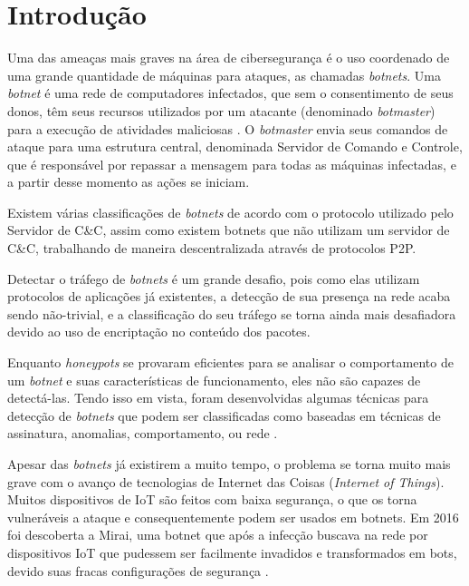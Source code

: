 \chapter{Introdução}
\label{c.introducao}

Uma das ameaças mais graves na área de cibersegurança é o uso coordenado de uma grande quantidade de máquinas para ataques, as chamadas \textit{botnets}. Uma \textit{botnet} é uma rede de computadores infectados, que sem o consentimento de seus donos, têm seus recursos utilizados por um atacante (denominado \textit{botmaster}) para a execução de atividades maliciosas \cite{miller2016role}. O \textit{botmaster} envia seus comandos de ataque para uma estrutura central, denominada Servidor de Comando e Controle, que é responsável por repassar a mensagem para todas as máquinas infectadas, e a partir desse momento as ações se iniciam.

Existem várias classificações de \textit{botnets} de acordo com o protocolo utilizado pelo Servidor de C\&C, assim como existem botnets que não utilizam um servidor de C\&C, trabalhando de maneira descentralizada através de protocolos P2P. 

Detectar o tráfego de \textit{botnets} é um grande desafio, pois como elas utilizam protocolos de aplicações já existentes, a detecção de sua presença na rede acaba sendo não-trivial, e a classificação do seu tráfego se torna ainda mais desafiadora devido ao uso de encriptação no conteúdo dos pacotes. \cite{lu2008botnets}
	
Enquanto \textit{honeypots} se provaram eficientes para se analisar o comportamento de um \textit{botnet} e suas características de funcionamento, eles não são capazes de detectá-las. Tendo isso em vista, foram desenvolvidas algumas técnicas para detecção de \textit{botnets} que podem ser classificadas como baseadas em técnicas de assinatura, anomalias, comportamento, ou rede \cite{asha2016analysis}.

Apesar das \textit{botnets} já existirem a muito tempo, o problema se torna muito mais grave com o avanço de tecnologias de Internet das Coisas (\textit{Internet of Things}). Muitos dispositivos de IoT são feitos com baixa segurança, o que os torna vulneráveis a ataque e consequentemente podem ser usados em botnets. Em 2016 foi descoberta a Mirai, uma botnet que após a infecção buscava na rede por dispositivos IoT que pudessem ser facilmente invadidos e transformados em bots, devido suas fracas configurações de segurança \cite{kambourakis2017mirai}. 

